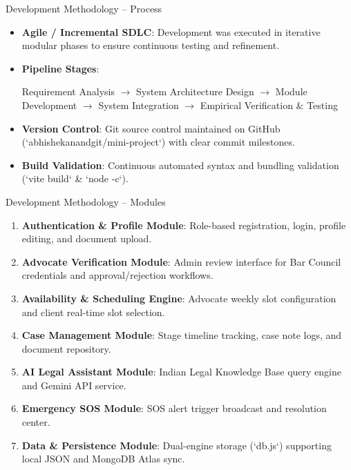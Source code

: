 \documentclass[10pt,aspectratio=169]{beamer}
\begin{document}
\begin{frame}{Development Methodology -- Process}
  \begin{itemize}
    \setlength{\itemsep}{10pt}
    \item \textbf{Agile / Incremental SDLC}: Development was executed in iterative modular phases to ensure continuous testing and refinement.
    \item \textbf{Pipeline Stages}:
      \begin{center}
        \small
        Requirement Analysis $\rightarrow$ System Architecture Design $\rightarrow$ Module Development $\rightarrow$ System Integration $\rightarrow$ Empirical Verification \& Testing
      \end{center}
    \item \textbf{Version Control}: Git source control maintained on GitHub (`abhishekanandgit/mini-project`) with clear commit milestones.
    \item \textbf{Build Validation}: Continuous automated syntax and bundling validation (`vite build` \& `node -c`).
  \end{itemize}
\end{frame}

\begin{frame}{Development Methodology -- Modules}
  \begin{enumerate}
    \setlength{\itemsep}{8pt}
    \item \textbf{Authentication \& Profile Module}: Role-based registration, login, profile editing, and document upload.
    \item \textbf{Advocate Verification Module}: Admin review interface for Bar Council credentials and approval/rejection workflows.
    \item \textbf{Availability \& Scheduling Engine}: Advocate weekly slot configuration and client real-time slot selection.
    \item \textbf{Case Management Module}: Stage timeline tracking, case note logs, and document repository.
    \item \textbf{AI Legal Assistant Module}: Indian Legal Knowledge Base query engine and Gemini API service.
    \item \textbf{Emergency SOS Module}: SOS alert trigger broadcast and resolution center.
    \item \textbf{Data & Persistence Module}: Dual-engine storage (`db.js`) supporting local JSON and MongoDB Atlas sync.
  \end{enumerate}
\end{frame}
\end{document}
